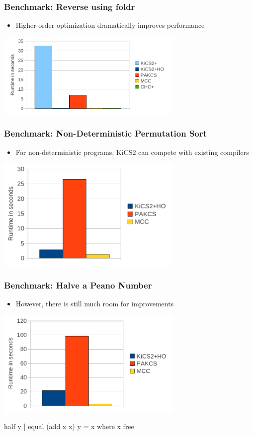 \documentclass[utf8]{beamer}
\newenvironment{program}{\begin{semiverbatim}\small}{\end{semiverbatim}}
\begin{document}
\begin{frame}
\frametitle{Benchmark: Reverse using foldr}
\begin{itemize}
\item Higher-order optimization dramatically improves performance
\end{itemize}
\begin{center}
\includegraphics[width=9cm]{reverseho}
\end{center}
\end{frame}

\begin{frame}
\frametitle{Benchmark: Non-Deterministic Permutation Sort}
\begin{itemize}
\item For non-deterministic programs, KiCS2 can compete with existing compilers
\end{itemize}
\begin{center}
\includegraphics[width=9cm]{permsort}
\end{center}
\end{frame}

\begin{frame}[fragile]
\frametitle{Benchmark: Halve a Peano Number}
\begin{itemize}
\item However, there is still much room for improvements
\end{itemize}
\begin{center}
\includegraphics[width=9cm]{half}
\begin{program}
        half y | equal (add x x) y = x where x free
\end{program}
\end{center}
\end{frame}
\end{document}
